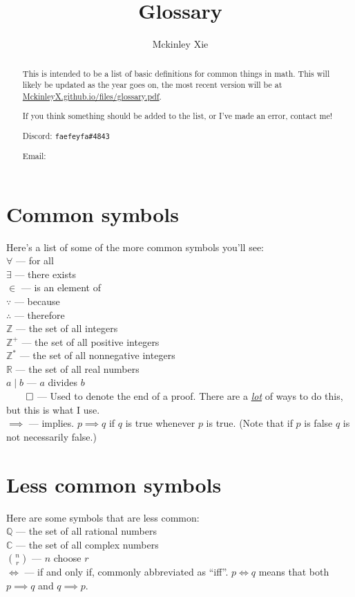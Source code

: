 \documentclass[a4paper]{scrartcl}
\title{Glossary}
\author{Mckinley Xie}
\newcommand{\term}[2]{\\$#1$  ---  #2}
\begin{document}
\maketitle
\begin{abstract}
	This is intended to be a list of basic definitions for common things in math. This will likely be updated as the year goes on, the most recent version will be at \url{MckinleyX.github.io/files/glossary.pdf}.

	If you think something should be added to the list, or I've made an error, contact me!

	Discord: \texttt{faefeyfa\#4843}

	Email: 
\end{abstract}
\section{Common symbols}
Here's a list of some of the more common symbols you'll see:
	\term{\forall}{for all} 
	\term{\exists}{there exists} 
	\term{\in}{is an element of}
	\term{\because}{because}
	\term{\therefore}{therefore}
	\term{\mathbb{Z}}{the set of all integers}
	\term{\mathbb{Z}^+}{the set of all positive integers}
	\term{\mathbb{Z}^*}{the set of all nonnegative integers}
	\term{\mathbb{R}}{the set of all real numbers}
	\term{a \mid b}{$a$ divides $b$}
	\term{\qed}{Used to denote the end of a proof. There are a \href{https://mathwithbaddrawings.com/2019/10/02/how-to-end-a-proof/}{\emph{lot}} of ways to do this, but this is what I use.}
	\term{\implies}{implies. $p \implies q$ if $q$ is true whenever $p$ is true. (Note that if $p$ is false $q$ is not necessarily false.)}
\section{Less common symbols}
Here are some symbols that are less common:
	\term{\mathbb{Q}}{the set of all rational numbers}
	\term{\mathbb{C}}{the set of all complex numbers}
	\term{\binom{n}{r}}{$n$ choose $r$}
	\term{\iff}{if and only if, commonly abbreviated as ``iff''. $p \iff q$ means that both $p \implies q$ and $q \implies p$.}
\end{document}
